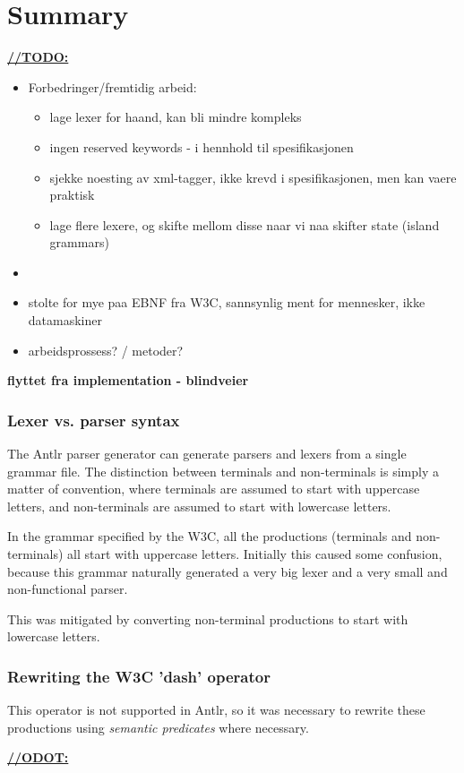 \chapter{Summary}

\underline{\textbf{\LARGE //TODO:}}
\begin{itemize}
	\item Forbedringer/fremtidig arbeid:
	
	\begin{itemize}
		\item lage lexer for haand, kan bli mindre kompleks
		\item ingen reserved keywords - i hennhold til spesifikasjonen
		\item sjekke noesting av xml-tagger, ikke krevd i spesifikasjonen, men kan vaere praktisk
		\item lage flere lexere, og skifte mellom disse naar vi naa skifter state
		(island grammars)
	\end{itemize}
	
	\item \item stolte for mye paa EBNF fra W3C, sannsynlig ment for mennesker, ikke datamaskiner
	\item arbeidsprossess? / metoder?
\end{itemize}

\textbf{\LARGE flyttet fra implementation - blindveier}

\subsection{Lexer vs. parser syntax}
The Antlr parser generator can generate parsers and lexers from a single grammar
file. The distinction between terminals and non-terminals is simply a matter of
convention, where terminals are assumed to start with uppercase letters, and
non-terminals are assumed to start with lowercase letters.

In the grammar specified by the W3C, all the productions (terminals and
non-terminals) all start with uppercase letters. Initially this caused some
confusion, because this grammar naturally generated a very big lexer and a very
small and non-functional parser.

This was mitigated by converting non-terminal productions to start with
lowercase letters.

\subsection{Rewriting the W3C 'dash' operator}
This operator is not supported in Antlr, so it was necessary to rewrite
these productions using \emph{semantic predicates} where necessary.

\underline{\textbf{\LARGE //ODOT:}}